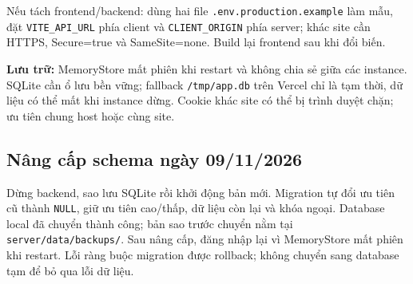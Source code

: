 Nếu tách frontend/backend: dùng hai file \texttt{.env.production.example} làm mẫu, đặt \texttt{VITE\_API\_URL} phía client và \texttt{CLIENT\_ORIGIN} phía server; khác site cần HTTPS, Secure=true và SameSite=none. Build lại frontend sau khi đổi biến.

\textbf{Lưu trữ:} MemoryStore mất phiên khi restart và không chia sẻ giữa các instance. SQLite cần ổ lưu bền vững; fallback \texttt{/tmp/app.db} trên Vercel chỉ là tạm thời, dữ liệu có thể mất khi instance dừng. Cookie khác site có thể bị trình duyệt chặn; ưu tiên chung host hoặc cùng site.

\subsection{Nâng cấp schema ngày 09/11/2026}
Dừng backend, sao lưu SQLite rồi khởi động bản mới. Migration tự đổi ưu tiên cũ
thành \texttt{NULL}, giữ ưu tiên cao/thấp, dữ liệu còn lại và khóa ngoại.
Database local đã chuyển thành công; bản sao trước chuyển nằm tại
\texttt{server/data/backups/}. Sau nâng cấp, đăng nhập lại vì MemoryStore mất phiên khi restart.
Lỗi ràng buộc migration được rollback; không chuyển sang database tạm để bỏ qua lỗi dữ liệu.
